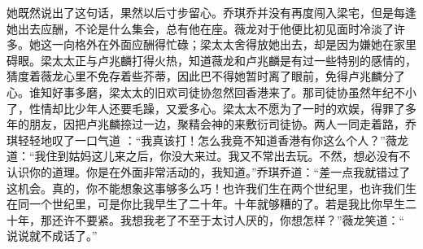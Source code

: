 \documentclass{article}
\begin{document}
她既然说出了这句话，果然以后寸步留心。乔琪乔并没有再度闯入梁宅，但是每逢她出去应酬，不论是什么集会，总有他在座。薇龙对于他便比初见面时冷淡了许多。她这一向格外在外面应酬得忙碌；梁太太舍得放她出去，却是因为嫌她在家里碍眼。梁太太正与卢兆麟打得火热，知道薇龙和卢兆麟是有过一些特别的感情的，猜度着薇龙心里不免存着些芥蒂，因此巴不得她暂时离了眼前，免得卢兆麟分了心。谁知好事多磨，梁太太的旧欢司徒协忽然回香港来了。那司徒协虽然年纪不小了，性情却比少年人还要毛躁，又爱多心。梁太太不愿为了一时的欢娱，得罪了多年的朋友，因把卢兆麟捺过一边，聚精会神的来敷衍司徒协。两人一同走着路，乔琪轻轻地叹了一口气道
\newpage
：“我真该打！怎么我竟不知道香港有你这么个人？”薇龙道：“我住到姑妈这儿来之后，你没大来过。我又不常出去玩。不然，想必没有不认识你的道理。你是在外面非常活动的，我知道。”乔琪乔道：“差一点我就错过了这机会。真的，你不能想象这事够多么巧！也许我们生在两个世纪里，也许我们生在同一个世纪里，可是你比我早生了二十年。十年就够糟的了。若是我比你早生二十年，那还许不要紧。我想我老了不至于太讨人厌的，你想怎样？”薇龙笑道：“
说说就不成话了。” 
\end{document}
